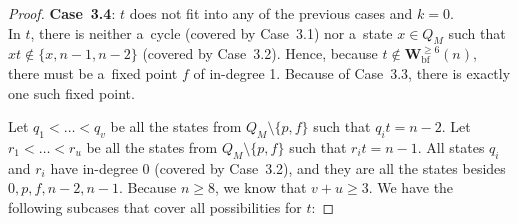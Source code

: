 \documentclass{amsart}
\renewcommand{\ge}{\geqslant}
\newcommand{\Wbf}{\mathbf{W}^{\ge 6}_{\mathrm{bf}}}
\begin{document}
\begin{proof}
\textbf{Case~3.4}: $t$ does not fit into any of the previous cases and $k=0$.\\
In $t$, there is neither a~cycle (covered by Case~3.1) nor a~state $x \in Q_M$ such that $xt \notin \{x,n-1,n-2\}$ (covered by Case~3.2).
Hence, because $t \notin \Wbf(n)$, there must be a~fixed point $f$ of in-degree 1.
Because of Case~3.3, there is exactly one such fixed point.

Let $q_1 < \ldots < q_v$ be all the states from $Q_M \setminus \{p,f\}$ such that $q_i t = n-2$.
Let $r_1 < \ldots < r_u$ be all the states from $Q_M \setminus \{p,f\}$ such that $r_i t = n-1$.
All states $q_i$ and $r_i$ have in-degree 0 (covered by Case~3.2), and they are all the states besides $0,p,f,n-2,n-1$.
Because $n \ge 8$, we know that $v+u \ge 3$.
We have the following subcases that cover all possibilities for $t$:


\end{proof}
\end{document}
